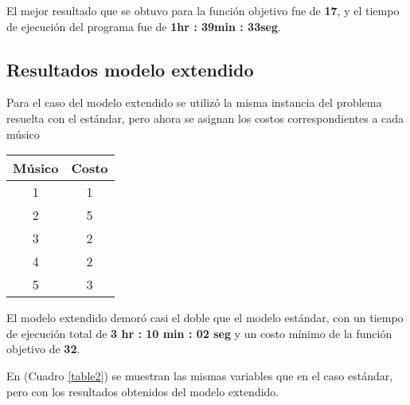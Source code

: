 \documentclass[journal, 10pt]{IEEEtran}
\begin{document}
El mejor resultado que se obtuvo para la función objetivo fue de \textbf{17}, y el tiempo de ejecución del programa fue de \textbf{1hr : 39min : 33seg}.

\newpage
\subsection{Resultados modelo extendido}
Para el caso del modelo extendido se utilizó la misma instancia del problema resuelta con el estándar, pero ahora se asignan los costos correspondientes a cada músico

\begin{center}
	\begin{tabular}{cc}
	Músico & Costo \\ \hline
	1 & 1\\
	2 & 5\\
	3 & 2\\
	4 & 2\\
	5 & 3
\end{tabular}
\end{center}


El modelo extendido demoró casi el doble que el modelo estándar, con un tiempo de ejecución total de \textbf{3 hr : 10 min : 02 seg} y un costo mínimo de la función objetivo de \textbf{32}. 

En (Cuadro \ref{table2}) se muestran las mismas variables que en el caso estándar, pero con los resultados obtenidos del modelo extendido. 
\end{document}
